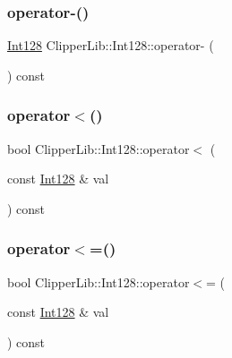 \mbox{\label{class_clipper_lib_1_1_int128_a10758b3c62928c3ed45298465b43992c}} 
\subsubsection{\texorpdfstring{operator-\/()}{operator-()}}
{\footnotesize\ttfamily \mbox{\hyperlink{class_clipper_lib_1_1_int128}{Int128}} Clipper\+Lib\+::\+Int128\+::operator-\/ (\begin{DoxyParamCaption}{ }\end{DoxyParamCaption}) const\hspace{0.3cm}{\ttfamily [inline]}}

\mbox{\label{class_clipper_lib_1_1_int128_ab55bb6a363e7ced8e5e64a1eefac6000}} 
\subsubsection{\texorpdfstring{operator$<$()}{operator<()}}
{\footnotesize\ttfamily bool Clipper\+Lib\+::\+Int128\+::operator$<$ (\begin{DoxyParamCaption}\item[{const \mbox{\hyperlink{class_clipper_lib_1_1_int128}{Int128}} \&}]{val }\end{DoxyParamCaption}) const\hspace{0.3cm}{\ttfamily [inline]}}

\mbox{\label{class_clipper_lib_1_1_int128_ab3667a2abe7b05841b8004496e4e5ddd}} 
\subsubsection{\texorpdfstring{operator$<$=()}{operator<=()}}
{\footnotesize\ttfamily bool Clipper\+Lib\+::\+Int128\+::operator$<$= (\begin{DoxyParamCaption}\item[{const \mbox{\hyperlink{class_clipper_lib_1_1_int128}{Int128}} \&}]{val }\end{DoxyParamCaption}) const\hspace{0.3cm}{\ttfamily [inline]}}

